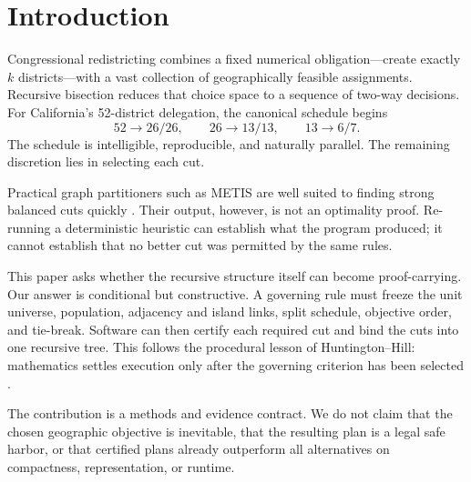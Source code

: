 \section{Introduction}

Congressional redistricting combines a fixed numerical obligation---create
exactly $k$ districts---with a vast collection of geographically feasible
assignments. Recursive bisection reduces that choice space to a sequence of
two-way decisions. For California's 52-district delegation, the canonical
schedule begins
\[
52\rightarrow 26/26,\qquad 26\rightarrow 13/13,\qquad
13\rightarrow 6/7.
\]
The schedule is intelligible, reproducible, and naturally parallel. The
remaining discretion lies in selecting each cut.

Practical graph partitioners such as METIS are well suited to finding strong
balanced cuts quickly \cite{karypis1998fast}. Their output, however, is not an
optimality proof. Re-running a deterministic heuristic can establish what the
program produced; it cannot establish that no better cut was permitted by the
same rules.

This paper asks whether the recursive structure itself can become
proof-carrying. Our answer is conditional but constructive. A governing rule
must freeze the unit universe, population, adjacency and island links, split
schedule, objective order, and tie-break. Software can then certify each
required cut and bind the cuts into one recursive tree. This follows the
procedural lesson of Huntington--Hill: mathematics settles execution only
after the governing criterion has been selected \cite{huntington1928}.

The contribution is a methods and evidence contract. We do not claim that the
chosen geographic objective is inevitable, that the resulting plan is a legal
safe harbor, or that certified plans already outperform all alternatives on
compactness, representation, or runtime.
